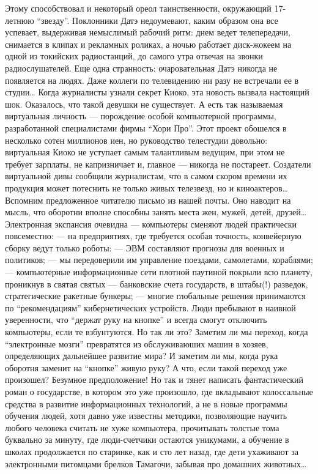 Этому способствовал и некоторый ореол таинственности, окружающий 17-летнюю ``звезду''. Поклонники Датэ недоумевают, каким образом она все успевает, выдерживая немыслимый рабочий ритм: днем ведет телепередачи, снимается в клипах и рекламных роликах, а ночью работает диск-жокеем на одной из токийских радиостанций, до самого утра отвечая на звонки радиослушателей. Еще одна странность: очаровательная Датэ никогда не появляется на людях. Даже коллеги по телевидению ни разу не встречали ее в студии… 
  Когда журналисты узнали секрет Киоко, эта новость вызвала настоящий шок. Оказалось, что такой девушки не существует. А есть так называемая виртуальная личность — порождение особой компьютерной программы, разработанной специалистами фирмы ``Хори Про''. 
 Этот проект обошелся в несколько сотен миллионов иен, но руководство телестудии довольно: виртуальная Киоко не уступает самым талантливым ведущим, при этом не требует зарплаты, не капризничает и, главное — никогда не постареет. 
Создатели виртуальной дивы сообщили журналистам, что в самом скором времени их продукция может потеснить не только живых телезвезд, но и киноактеров… 
Вспомним предложенное читателю письмо из нашей почты. Оно наводит на мысль, что оборотни вполне способны занять места жен, мужей, детей, друзей… 
Электронная экспансия очевидна — компьютеры сменяют людей практически повсеместно: 
— на предприятиях, где требуется особая точность, конвейерную сборку ведут только роботы: 
— ЭВМ составляют прогнозы для военных и политиков; 
— мы передоверили им управление поездами, самолетами, кораблями; 
— компьютерные информационные сети плотной паутиной покрыли всю планету, проникнув в святая святых — банковские счета государств, в штабы(!) разведок, стратегические ракетные бункеры; 
— многие глобальные решения принимаются по ``рекомендациям'' кибернетических устройств. 
Люди пребывают в наивной уверенности, что ``держат руку на кнопке'' и всегда смогут отключить компьютеры, если те взбунтуются. Но так ли это? Заметим ли мы переход, когда ``электронные мозги'' превратятся из обслуживаюших машин в хозяев, определяющих дальнейшее развитие мира? И заметим ли мы, когда рука оборотня заменит на ``кнопке'' живую руку? 
 А что, если такой переход уже произошел? Безумное предположение! Но так и тянет написать фантастический роман о государстве, в котором это уже произошло, где вкладывают колоссальные средства в развитие информационных технологий, а не в новые программы обучения людей, хотя давно уже известны методики, позволяющие научить любого человека считать не хуже компьютера, прочитывать толстые тома буквально за минуту, где люди-счетчики остаются уникумами, а обучение в школах продолжается по старинке, как и сто лет назад, где дети ухаживают за электронными питомцами брелков Тамагочи, забывая про домашних животных… 

